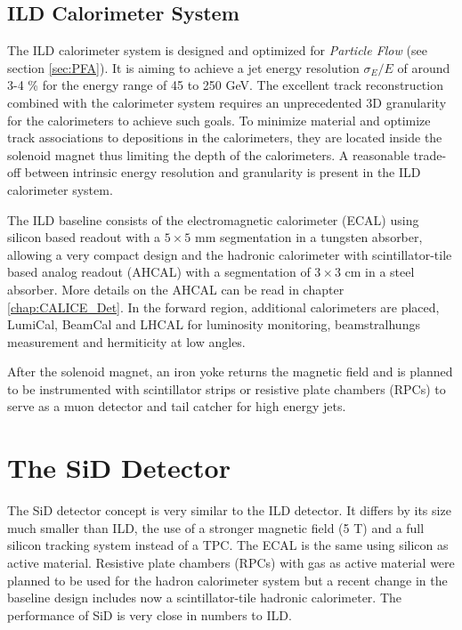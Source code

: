 \subsection{ILD Calorimeter System}

The ILD calorimeter system is designed and optimized for \textit{Particle Flow} (see section \ref{sec:PFA}). It is aiming to achieve a jet energy resolution $\sigma_E/E$ of around 3-4 \% for the energy range of 45 to 250 GeV. The excellent track reconstruction combined with the calorimeter system requires an unprecedented 3D granularity for the calorimeters to achieve such goals. To minimize material and optimize track associations to depositions in the calorimeters, they are located inside the solenoid magnet thus limiting the depth of the calorimeters. A reasonable trade-off between intrinsic energy resolution and granularity is present in the ILD calorimeter system.

The ILD baseline consists of the electromagnetic calorimeter (ECAL) using silicon based readout with a $5 \times 5$ mm segmentation in a tungsten absorber, allowing a very compact design and the hadronic calorimeter with scintillator-tile based analog readout (AHCAL) with a segmentation of $3 \times 3$ cm in a steel absorber. More details on the AHCAL can be read in chapter \ref{chap:CALICE_Det}. In the forward region, additional calorimeters are placed, LumiCal, BeamCal and LHCAL for luminosity monitoring, beamstralhungs measurement and hermiticity at low angles.

After the solenoid magnet, an iron yoke returns the magnetic field and is planned to be instrumented with scintillator strips or resistive plate chambers (RPCs) to serve as a muon detector and tail catcher for high energy jets.

\section{The SiD Detector}

The SiD detector concept is very similar to the ILD detector. It differs by its size much smaller than ILD, the use of a stronger magnetic field (5 T) and a full silicon tracking system instead of a TPC. The ECAL is the same using silicon as active material. Resistive plate chambers (RPCs) with gas as active material were planned to be used for the hadron calorimeter system but a recent change in the baseline design includes now a scintillator-tile hadronic calorimeter. The performance of SiD is very close in numbers to ILD.

